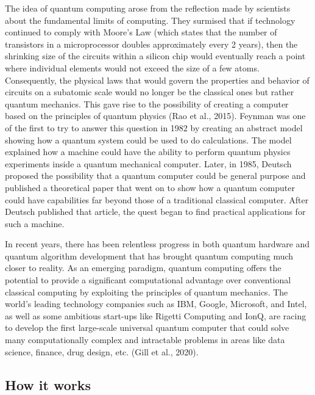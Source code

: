 \documentclass[
  letterpaper,
  DIV=11,
  numbers=noendperiod]{scrreprt}
\begin{document}
The idea of quantum computing arose from the reflection made by
scientists about the fundamental limits of computing. They surmised that
if technology continued to comply with Moore's Law (which states that
the number of transistors in a microprocessor doubles approximately
every 2 years), then the shrinking size of the circuits within a silicon
chip would eventually reach a point where individual elements would not
exceed the size of a few atoms. Consequently, the physical laws that
would govern the properties and behavior of circuits on a subatomic
scale would no longer be the classical ones but rather quantum
mechanics. This gave rise to the possibility of creating a computer
based on the principles of quantum physics (Rao et al., 2015). Feynman
was one of the first to try to answer this question in 1982 by creating
an abstract model showing how a quantum system could be used to do
calculations. The model explained how a machine could have the ability
to perform quantum physics experiments inside a quantum mechanical
computer. Later, in 1985, Deutsch proposed the possibility that a
quantum computer could be general purpose and published a theoretical
paper that went on to show how a quantum computer could have
capabilities far beyond those of a traditional classical computer. After
Deutsch published that article, the quest began to find practical
applications for such a machine.

In recent years, there has been relentless progress in both quantum
hardware and quantum algorithm development that has brought quantum
computing much closer to reality. As an emerging paradigm, quantum
computing offers the potential to provide a significant computational
advantage over conventional classical computing by exploiting the
principles of quantum mechanics. The world's leading technology
companies such as IBM, Google, Microsoft, and Intel, as well as some
ambitious start-ups like Rigetti Computing and IonQ, are racing to
develop the first large-scale universal quantum computer that could
solve many computationally complex and intractable problems in areas
like data science, finance, drug design, etc. (Gill et al., 2020).

\hypertarget{how-it-works-3}{%
\subsection{How it works}\label{how-it-works-3}}
\end{document}
